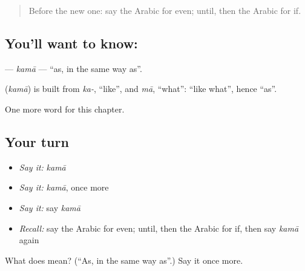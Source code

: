 \label{lesson:AR-C207-kama}



\begin{quote}
Before the new one: say the Arabic for even; until, then the Arabic for if.
\end{quote}

\subsection*{You'll want to know: }
\textbf{} — \emph{kamā} — \textquotedblleft{}as, in the same way as\textquotedblright{}.

\begin{cousinweb}
\textbf{} (\emph{kamā}) is built from \emph{ka-}, \textquotedblleft{}like\textquotedblright{}, and \emph{mā}, \textquotedblleft{}what\textquotedblright{}: \textquotedblleft{}like what\textquotedblright{}, hence \textquotedblleft{}as\textquotedblright{}.
\end{cousinweb}

\begin{grammarlens}[title={What you've built}]
One more word for this chapter.
\end{grammarlens}

\subsection*{Your turn}
\begin{itemize}
\raggedright
  \item \emph{Say it:} \emph{kamā}
  \item \emph{Say it:} \emph{kamā}, once more
  \item \emph{Say it:} say \emph{kamā}
  \item \emph{Recall:} say the Arabic for even; until, then the Arabic for if, then say \emph{kamā} again
\end{itemize}

\begin{tcolorbox}[breakable,colback=teal!4,colframe=teal!35!black,title={Before you move on}]
What does  mean? (\textquotedblleft{}As, in the same way as\textquotedblright{}.) Say it once more.
\end{tcolorbox}
